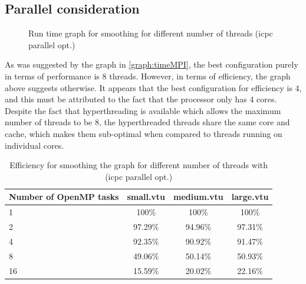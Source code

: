 \documentclass[fleqn,11pt]{SelfArx} %
\theoremstyle{definition}
\begin{document}
\subsection{Parallel consideration}
\begin{figure}[!h]
    \center
    \caption{Run time graph for smoothing for different number of threads (icpc parallel opt.)}
    \label{graph:timeMPI2}
\end{figure}

As was suggested by the graph in \ref{graph:timeMPI}, the best configuration purely in terms of performance is 8 threads. However, in terms of efficiency, the graph above suggests otherwise. It appears that the best configuration for efficiency is 4, and this must be attributed to the fact that the processor only has 4 cores. Despite the fact that hyperthreading is available which allows the maximum number of threads to be 8, the hyperthreaded threads share the same core and cache, which makes them sub-optimal when compared to threads running on individual cores.

\begin{table}[!h]
\centering
\begin{tabular}{l|c|c|c}
Number of OpenMP tasks & small.vtu & medium.vtu & large.vtu \\  \hline
1 & 100\% & 100\% & 100\% \\
2 & 97.29\% & 94.96\% & 97.31\% \\
4 & 92.35\% & 90.92\% & 91.47\% \\
8 & 49.06\% & 50.14\% & 50.93\% \\
16 & 15.59\% & 20.02\% & 22.16\% \\
\end{tabular}
\caption{Efficiency for smoothing the graph for different number of threads with (icpc parallel opt.)}
\end{table}
\end{document}
